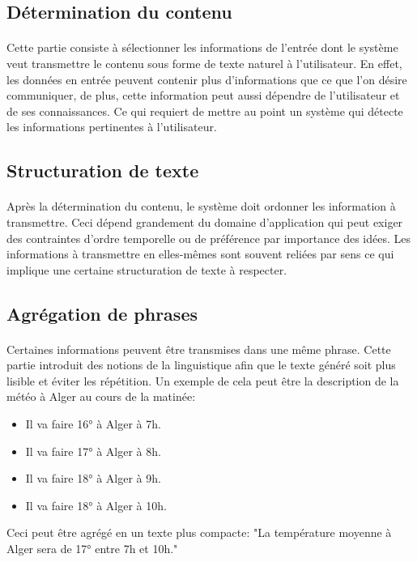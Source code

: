 	\subsection{Détermination du contenu}
	\paragraph{}
	Cette partie consiste à sélectionner les informations de l’entrée dont le système veut transmettre le contenu sous forme de texte naturel à l’utilisateur. En effet, les données en entrée peuvent contenir plus d’informations que ce que l’on désire communiquer\cite{Yu:2007}, de plus, cette information peut aussi dépendre de l’utilisateur et de ses connaissances\cite{Dethlefs2014}. Ce qui requiert de mettre au point un système qui détecte les informations pertinentes à l’utilisateur.
	\subsection{Structuration de texte}
	\paragraph{}
	Après la détermination du contenu, le système doit ordonner les information à transmettre. Ceci dépend grandement du domaine d’application qui peut exiger des contraintes d’ordre temporelle ou de préférence par importance des idées. Les informations à transmettre en elles-mêmes sont souvent reliées par sens ce qui implique une certaine structuration de texte à respecter.\newpage
	\subsection{Agrégation de phrases}
	\paragraph{}
	Certaines informations peuvent être transmises dans une même phrase. Cette partie introduit des notions de la linguistique afin que le texte généré soit plus lisible et éviter les répétition. Un exemple de cela peut être la description de la météo à Alger au cours de la matinée:
	\begin{itemize}
		\item Il va faire 16° à Alger à 7h.
		\item Il va faire 17° à Alger à 8h.
		\item Il va faire 18° à Alger à 9h.
		\item Il va faire 18° à Alger à 10h.
	\end{itemize}
	Ceci peut être agrégé en un texte plus compacte: "La température moyenne à Alger sera de 17° entre 7h et 10h."
	
